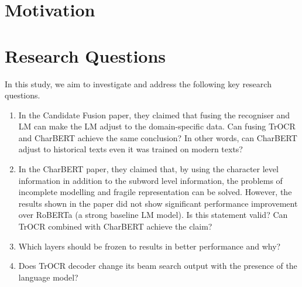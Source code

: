 \label{chap:1_intro}
\section{Motivation}
\section{Research Questions}
In this study, we aim to investigate and address the following key research questions. 
\begin{enumerate}
    \item In the Candidate Fusion paper, they claimed that fusing the recogniser and LM can make the LM adjust to the domain-specific data. Can fusing TrOCR and CharBERT achieve the same conclusion? In other words, can CharBERT adjust to historical texts even it was trained on modern texts?
    \item In the CharBERT paper, they claimed that, by using the character level information in addition to the subword level information, the problems of incomplete modelling and fragile 
    representation can be solved. However, the results shown in the paper did not show significant performance improvement over RoBERTa (a strong baseline LM model). Is this statement valid? Can TrOCR combined with CharBERT achieve the claim?
    \item Which layers should be frozen to results in better performance and why?
    \item Does TrOCR decoder change its beam search output with the presence of the language model?
\end{enumerate}

